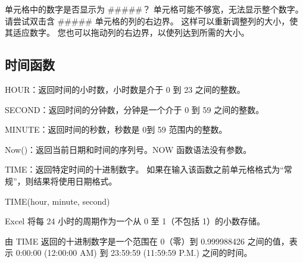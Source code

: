 单元格中的数字是否显示为 \#\#\#\#\#？ 单元格可能不够宽，无法显示整个数字。 请尝试双击含 \#\#\#\#\# 单元格的列的右边界。 这样可以重新调整列的大小，使其适应数字。 您也可以拖动列的右边界，以使列达到所需的大小。

\subsection{时间函数}

HOUR：返回时间的小时数，小时数是介于 0 到 23 之间的整数。

SECOND：返回时间的分钟数，分钟是一个介于 0 到 59 之间的整数。

MINUTE：返回时间的秒数，秒数是 0到 59 范围内的整数。

Now()：返回当前日期和时间的序列号。NOW 函数语法没有参数。

TIME：返回特定时间的十进制数字。 如果在输入该函数之前单元格格式为``常规''，则结果将使用日期格式。

TIME(hour, minute, second)

Excel 将每 24 小时的周期作为一个从 0 至 1（不包括 1）的小数存储。

由 TIME 返回的十进制数字是一个范围在 0（零）到 0.999988426 之间的值，表示 0:00:00 (12:00:00 AM) 到 23:59:59 (11:59:59 P.M.) 之间的时间。